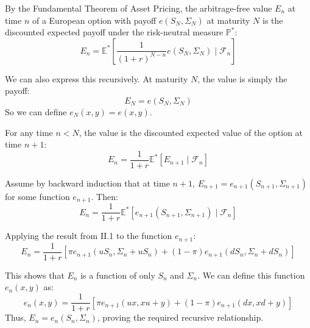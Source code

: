\begin{enumerate}
            By the Fundamental Theorem of Asset Pricing, the arbitrage-free value $E_n$ at time $n$ of a European option with payoff $e(S_N, \Sigma_N)$ at maturity $N$ is the discounted expected payoff under the risk-neutral measure $\mathbb{P}^*$:
            \[ E_n = \mathbb{E}^*\left[ \frac{1}{(1+r)^{N-n}} e(S_N, \Sigma_N) \mid \mathcal{F}_n \right] \]

            We can also express this recursively. At maturity $N$, the value is simply the payoff:
            \[ E_N = e(S_N, \Sigma_N) \]
            So we can define $e_N(x, y) = e(x, y)$.

            For any time $n < N$, the value is the discounted expected value of the option at time $n+1$:
            \[ E_n = \frac{1}{1+r} \mathbb{E}^*[E_{n+1} \mid \mathcal{F}_n] \]

            Assume by backward induction that at time $n+1$, $E_{n+1} = e_{n+1}(S_{n+1}, \Sigma_{n+1})$ for some function $e_{n+1}$. Then:
            \[ E_n = \frac{1}{1+r} \mathbb{E}^*[e_{n+1}(S_{n+1}, \Sigma_{n+1}) \mid \mathcal{F}_n] \]

            Applying the result from II.1 to the function $e_{n+1}$:
            \[ E_n = \frac{1}{1+r} \left[ \pi e_{n+1}(u S_n, \Sigma_n + u S_n) + (1 - \pi) e_{n+1}(d S_n, \Sigma_n + d S_n) \right] \]

            This shows that $E_n$ is a function of only $S_n$ and $\Sigma_n$. We can define this function $e_n(x, y)$ as:
            \[ e_n(x, y) = \frac{1}{1+r} \left[ \pi e_{n+1}(u x, x u + y) + (1 - \pi) e_{n+1}(d x, x d + y) \right] \]
            Thus, $E_n = e_n(S_n, \Sigma_n)$, proving the required recursive relationship.

\end{enumerate}
